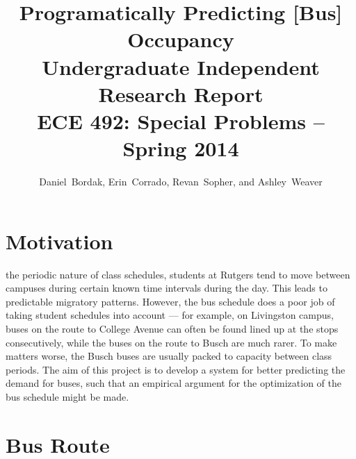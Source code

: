 \documentclass[11pt,journal,compsoc]{IEEEtran} %
\begin{document}
\title{Programatically Predicting [Bus] Occupancy\\[-2mm]
{\large Undergraduate Independent Research Report}\\[-3mm]
{\large ECE 492: Special Problems -- Spring 2014}}
\author{Daniel~Bordak, Erin~Corrado, Revan~Sopher, and Ashley~Weaver}


\maketitle


\section{Motivation}

 the periodic nature of class schedules, students at Rutgers tend to move between campuses during certain known time intervals during the day.
This leads to predictable migratory patterns.
However, the bus schedule does a poor job of taking student schedules into account --- for example, on Livingston campus, buses on the route to College Avenue can often be found lined up at the stops consecutively, while the buses on the route to Busch are much rarer.
To make matters worse, the Busch buses are usually packed to capacity between class periods.
The aim of this project is to develop a system for better predicting the demand for buses, such that an empirical argument for the optimization of the bus schedule might be made.



\section{Bus Route}
\end{document}
